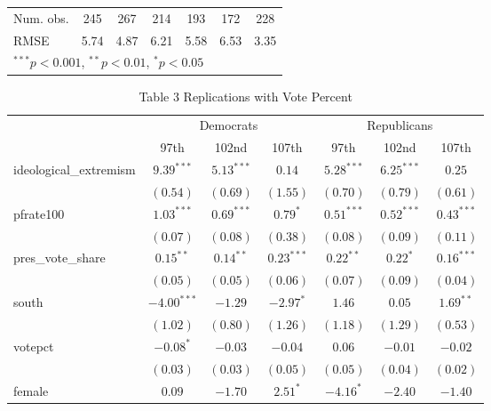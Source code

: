 \documentclass[12pt]{article}
\begin{document}
\begin{table}
\begin{center}
\begin{tabular}{l c c c c c c }
			Num. obs.              & 245           & 267          & 214           & 193          & 172           & 228           \\
			RMSE                   & 5.74          & 4.87         & 6.21          & 5.58         & 6.53          & 3.35          \\
			\hline
			\multicolumn{7}{l}{\scriptsize{$^{***}p<0.001$, $^{**}p<0.01$, $^*p<0.05$}}
		\end{tabular}
	\end{center}
\end{table}

\begin{table}
	\begin{center}
		\caption{Table 3 Replications with Vote Percent}
		\begin{tabular}{l c c c c c c }
			\hline
			& \multicolumn{3}{c}{Democrats} & \multicolumn{3}{c}{Republicans} \\
			\cline{2-7}
			& 97th & 102nd & 107th & 97th & 102nd & 107th \\
			\hline
			ideological\_extremism & $9.39^{***}$  & $5.13^{***}$ & $0.14$       & $5.28^{***}$ & $6.25^{***}$  & $0.25$        \\
			& $(0.54)$      & $(0.69)$     & $(1.55)$     & $(0.70)$     & $(0.79)$      & $(0.61)$      \\
			pfrate100              & $1.03^{***}$  & $0.69^{***}$ & $0.79^{*}$   & $0.51^{***}$ & $0.52^{***}$  & $0.43^{***}$  \\
			& $(0.07)$      & $(0.08)$     & $(0.38)$     & $(0.08)$     & $(0.09)$      & $(0.11)$      \\
			pres\_vote\_share      & $0.15^{**}$   & $0.14^{**}$  & $0.23^{***}$ & $0.22^{**}$  & $0.22^{*}$    & $0.16^{***}$  \\
			& $(0.05)$      & $(0.05)$     & $(0.06)$     & $(0.07)$     & $(0.09)$      & $(0.04)$      \\
			south                  & $-4.00^{***}$ & $-1.29$      & $-2.97^{*}$  & $1.46$       & $0.05$        & $1.69^{**}$   \\
			& $(1.02)$      & $(0.80)$     & $(1.26)$     & $(1.18)$     & $(1.29)$      & $(0.53)$      \\
			votepct                & $-0.08^{*}$   & $-0.03$      & $-0.04$      & $0.06$       & $-0.01$       & $-0.02$       \\
			& $(0.03)$      & $(0.03)$     & $(0.05)$     & $(0.05)$     & $(0.04)$      & $(0.02)$      \\
			female                 & $0.09$        & $-1.70$      & $2.51^{*}$   & $-4.16^{*}$  & $-2.40$       & $-1.40$       \\

\end{tabular}
\end{center}
\end{table}
\end{document}
